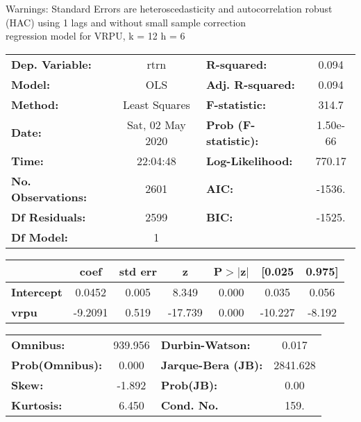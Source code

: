 Warnings: \newline
 [1] Standard Errors are heteroscedasticity and autocorrelation robust (HAC) using 1 lags and without small sample correction\\ 

regression model for VRPU, k = 12 h = 6\begin{center}
\begin{tabular}{lclc}
\toprule
\textbf{Dep. Variable:}    &       rtrn       & \textbf{  R-squared:         } &     0.094   \\
\textbf{Model:}            &       OLS        & \textbf{  Adj. R-squared:    } &     0.094   \\
\textbf{Method:}           &  Least Squares   & \textbf{  F-statistic:       } &     314.7   \\
\textbf{Date:}             & Sat, 02 May 2020 & \textbf{  Prob (F-statistic):} &  1.50e-66   \\
\textbf{Time:}             &     22:04:48     & \textbf{  Log-Likelihood:    } &    770.17   \\
\textbf{No. Observations:} &        2601      & \textbf{  AIC:               } &    -1536.   \\
\textbf{Df Residuals:}     &        2599      & \textbf{  BIC:               } &    -1525.   \\
\textbf{Df Model:}         &           1      & \textbf{                     } &             \\
\bottomrule
\end{tabular}
\begin{tabular}{lcccccc}
                   & \textbf{coef} & \textbf{std err} & \textbf{z} & \textbf{P$> |$z$|$} & \textbf{[0.025} & \textbf{0.975]}  \\
\midrule
\textbf{Intercept} &       0.0452  &        0.005     &     8.349  &         0.000        &        0.035    &        0.056     \\
\textbf{vrpu}      &      -9.2091  &        0.519     &   -17.739  &         0.000        &      -10.227    &       -8.192     \\
\bottomrule
\end{tabular}
\begin{tabular}{lclc}
\textbf{Omnibus:}       & 939.956 & \textbf{  Durbin-Watson:     } &    0.017  \\
\textbf{Prob(Omnibus):} &   0.000 & \textbf{  Jarque-Bera (JB):  } & 2841.628  \\
\textbf{Skew:}          &  -1.892 & \textbf{  Prob(JB):          } &     0.00  \\
\textbf{Kurtosis:}      &   6.450 & \textbf{  Cond. No.          } &     159.  \\
\bottomrule
\end{tabular}
\end{center}

